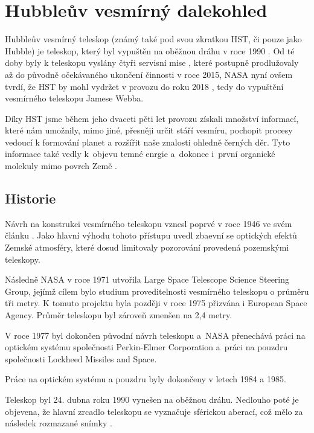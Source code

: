 \documentclass[a4paper,11pt]{article}
\begin{document}
\section{Hubbleův vesmírný dalekohled}
Hubbleův vesmírný teleskop (známý také pod svou zkratkou HST, či pouze jako Hubble) je teleskop, který byl vypuštěn na oběžnou dráhu v roce 1990 \cite{nasaHubbleChronology}. Od té doby byly k teleskopu vyslány čtyři servisní mise \cite{hubbleSiteServicingMissions}, které postupně prodlužovaly až do původně očekávaného ukončení činnosti v roce 2015, NASA nyní ovšem tvrdí, že HST by mohl vydržet v provozu do roku 2018 \cite{hubbleUntil2018}, tedy do vypuštění vesmírného teleskopu Jamese Webba.

Díky HST jsme během jeho dvaceti pěti let provozu získali množství informací, které nám umožnily, mimo jiné, přesněji určit stáří vesmíru, pochopit procesy vedoucí k formování planet a rozšířit naše znalosti ohledně černých děr. Tyto informace také vedly k~objevu temné enrgie a~dokonce i~první organické molekuly mimo povrch Země \cite{nasaHubbleAccomplishments}.

\subsection{Historie}

Návrh na konstrukci vesmírného teleskopu vznesl poprvé v roce 1946 ve svém článku \cite{LymanSpitzer1990131}. Jako hlavní výhodu tohoto přístupu uvedl zbaevní se optických efektů Zemské atmosféry, které dosud limitovaly pozorování provedená pozemskými teleskopy.

Následně NASA v roce 1971 utvořila Large Space Telescope Science Steering Group, jejímž cílem bylo studium proveditelnosti vesmírného teleskopu o průměru tři metry. K tomuto projektu byla později v roce 1975 přizvána i European Space Agency. Průměr teleskopu byl zároveň zmenšen na 2,4 metry. 

V roce 1977 byl dokončen původní návrh teleskopu a~NASA přenechává práci na optickém systému společnosti Perkin-Elmer Corporation a~práci na pouzdru společnosti Lockheed Missiles and Space.

Práce na optickém systému a pouzdru byly dokončeny v letech 1984 a 1985.

Teleskop byl 24. dubna roku 1990 vynešen na oběžnou dráhu. Nedlouho poté je objevena, že hlavní zrcadlo teleskopu se vyznačuje sférickou aberací, což mělo za následek rozmazané snímky \cite{nasaHubbleChronology}.
\end{document}
